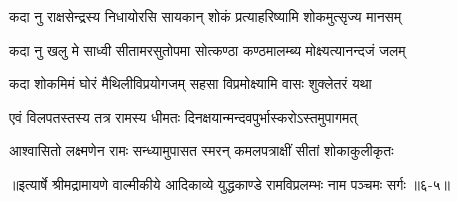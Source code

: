 \twolineshloka
{कदा नु राक्षसेन्द्रस्य निधायोरसि सायकान्}
{शोकं प्रत्याहरिष्यामि शोकमुत्सृज्य मानसम्} %

\twolineshloka
{कदा नु खलु मे साध्वी सीतामरसुतोपमा}
{सोत्कण्ठा कण्ठमालम्ब्य मोक्ष्यत्यानन्दजं जलम्} %

\twolineshloka
{कदा शोकमिमं घोरं मैथिलीविप्रयोगजम्}
{सहसा विप्रमोक्ष्यामि वासः शुक्लेतरं यथा} %

\twolineshloka
{एवं विलपतस्तस्य तत्र रामस्य धीमतः}
{दिनक्षयान्मन्दवपुर्भास्करोऽस्तमुपागमत्} %

\twolineshloka
{आश्वासितो लक्ष्मणेन रामः सन्ध्यामुपासत}
{स्मरन् कमलपत्राक्षीं सीतां शोकाकुलीकृतः} %


॥इत्यार्षे श्रीमद्रामायणे वाल्मीकीये आदिकाव्ये युद्धकाण्डे रामविप्रलम्भः नाम पञ्चमः सर्गः ॥६-५॥
